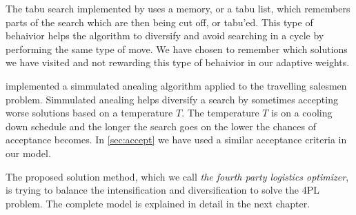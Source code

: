 \documentclass[../main.tex]{subfiles}
\begin{document}
The tabu search implemented by \cite{glover86} uses a memory, or a tabu list, which remembers parts of the search which are then being cut off, or tabu'ed.
This type of behaivior helps the algorithm to diversify and avoid searching in a cycle by performing the same type of move. 
We have chosen to remember which solutions we have visited and not rewarding this type of behaivior in our adaptive weights. \par

\cite{kirkpatrick83} implemented a simmulated anealing algorithm applied to the travelling salesmen problem. Simmulated anealing helps diversify a search by sometimes accepting worse solutions based on a temperature $T$. 
The temperature $T$ is on a cooling down schedule and the longer the search goes on the lower the chances of acceptance becomes. 
In \cref{sec:accept} we have used a similar acceptance criteria in our model.

The proposed solution method, which we call \textit{the fourth party logistics optimizer}, is trying to balance the intensification and diversification to solve the 4PL problem. The complete model is explained in detail in the next chapter.
\biblio
\end{document}
